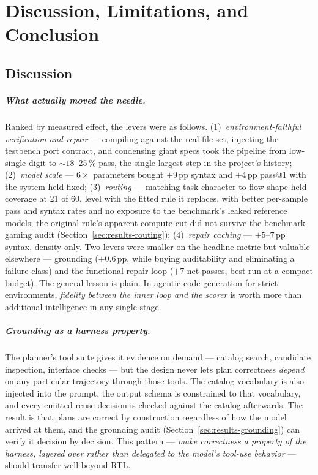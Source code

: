 
\chapter{Discussion, Limitations, and Conclusion}
\label{ch:06}

\section{Discussion}
\label{sec:discussion}

\paragraph{What actually moved the needle.}
Ranked by measured effect, the levers were as follows. (1)~\emph{environment-faithful
verification and repair} --- compiling against the real file set,
injecting the testbench port contract, and condensing giant specs took the
pipeline from low-single-digit to ${\sim}18$--25\,\% pass, the single
largest step in the project's history; (2)~\emph{model scale} ---
$6\times$ parameters bought $+9$\,pp syntax and $+4$\,pp pass@1 with the
system held fixed; (3)~\emph{routing} --- matching task character to
flow shape held coverage at 21 of 60, level with the fitted rule it
replaces, with better per-sample
pass and syntax rates and no exposure to the benchmark's leaked
reference models; the original rule's apparent compute cut did
not survive the benchmark-gaming audit
(Section~\ref{sec:results-routing}); (4)~\emph{repair caching} ---
$+5$--$7$\,pp syntax, density only. Two levers were smaller on the
headline metric but valuable elsewhere --- grounding ($+0.6$\,pp, while
buying auditability and eliminating a failure class) and the functional
repair loop ($+7$ net passes, best run at a compact budget). The
general lesson is plain. In agentic code generation for strict
environments, \emph{fidelity between the inner loop and the scorer} is
worth more than additional intelligence in any single stage.

\paragraph{Grounding as a harness property.}
The planner's tool suite gives it evidence on demand --- catalog search,
candidate inspection, interface checks --- but the design never lets
plan correctness \emph{depend} on any particular trajectory through
those tools. The catalog vocabulary is also injected into the prompt,
the output schema is constrained to that vocabulary, and every emitted
reuse decision is checked against the catalog afterwards. The result is
that plans are correct by construction regardless of how the model
arrived at them, and the grounding audit
(Section~\ref{sec:results-grounding}) can verify it decision by
decision. This pattern --- \emph{make correctness a property
of the harness, layered over rather than delegated to the model's
tool-use behavior} --- should transfer well beyond RTL.

